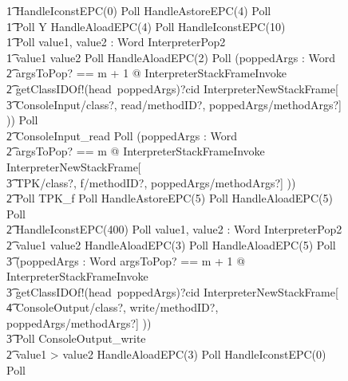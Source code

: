 \begin{figure}
\begin{circus}
    \t1 HandleIconstEPC(0) \circseq Poll \circseq HandleAstoreEPC(4) \circseq Poll \circseq \\
    \t1 Poll \circseq \circmu Y \circspot HandleAloadEPC(4) \circseq Poll \circseq HandleIconstEPC(10) \circseq \\
    \t1 Poll \circseq \circvar value1, value2 : Word \circspot InterpreterPop2 \circseq \\
    \t1 \circif value1 \leq value2 \circseq Poll \circseq HandleAloadEPC(2) \circseq Poll \circseq  (\circvar poppedArgs : \seq Word \circspot \\
    \t2 \lschexpract \exists argsToPop? == m + 1 @ InterpreterStackFrameInvoke \rschexpract \circseq \\
    \t2 getClassIDOf!(head~poppedArgs)?cid \then \lschexpract InterpreterNewStackFrame[ \\
    \t3 ConsoleInput/class?, read/methodID?, poppedArgs/methodArgs?] \rschexpract)) \circseq Poll \circseq \\
    \t2 ConsoleInput\_read \circseq Poll \circseq (\circvar poppedArgs : \seq Word \circspot \\
    \t2 \lschexpract \exists argsToPop? == m @ InterpreterStackFrameInvoke \rschexpract \circseq \lschexpract InterpreterNewStackFrame[\\
    \t3 TPK/class?, f/methodID?, poppedArgs/methodArgs?] \rschexpract)) \circseq \\
    \t2 Poll \circseq TPK\_f  \circseq Poll \circseq HandleAstoreEPC(5) \circseq Poll \circseq HandleAloadEPC(5) \circseq Poll \circseq \\
    \t2 HandleIconstEPC(400) \circseq Poll \circseq \circvar value1, value2 : Word \circspot InterpreterPop2 \circseq \\
    \t2 \circif value1 \leq value2 \circthen HandleAloadEPC(3) \circseq Poll \circseq HandleAloadEPC(5) \circseq Poll \circseq \\
    \t3 (\circvar poppedArgs : \seq Word \circspot \lschexpract \exists argsToPop? == m + 1 @ InterpreterStackFrameInvoke \rschexpract \circseq \\
    \t3 getClassIDOf!(head~poppedArgs)?cid \then \lschexpract InterpreterNewStackFrame[ \\
    \t4 ConsoleOutput/class?, write/methodID?, poppedArgs/methodArgs?] \rschexpract)) \circseq \\
    \t3 Poll \circseq ConsoleOutput\_write \\
    \t2 {} \circelse value1 > value2 \circthen HandleAloadEPC(3) \circseq Poll \circseq HandleIconstEPC(0) \circseq Poll \circseq \\

\end{circus}
\end{figure}
